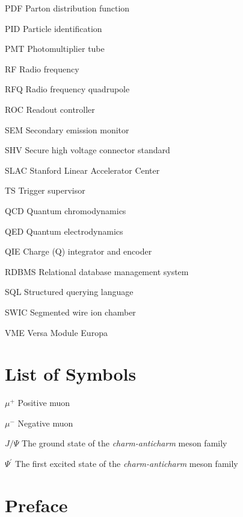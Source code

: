 \documentclass[edeposit,fullpage]{uiucthesis2009}
\begin{document}
\begin{symbollist*}
	\item[PDF] Parton distribution function
	\item[PID] Particle identification
	\item[PMT] Photomultiplier tube
	\item[RF] Radio frequency
	\item[RFQ] Radio frequency quadrupole
	\item[ROC] Readout controller
	\item[SEM] Secondary emission monitor
	\item[SHV] Secure high voltage connector standard
	\item{SLAC} Stanford Linear Accelerator Center
	\item[TS] Trigger supervisor
	\item[QCD] Quantum chromodynamics
	\item[QED] Quantum electrodynamics
	\item[QIE] Charge (Q) integrator and encoder
	\item[RDBMS] Relational database management system
	\item[SQL] Structured querying language
	\item[SWIC] Segmented wire ion chamber
	\item[VME] Versa Module Europa
\end{symbollist*}

\chapter{List of Symbols}

\begin{symbollist}[0.7in]
\item[$\mu^+$] Positive muon
\item[$\mu^-$] Negative muon
\item[$J/\Psi$] The ground state of the \emph{charm-anticharm} meson family
\item[$\Psi^\prime$] The first excited state of the \emph{charm-anticharm} meson family
\end{symbollist}

\mainmatter

\chapter*{Preface}
\end{document}
